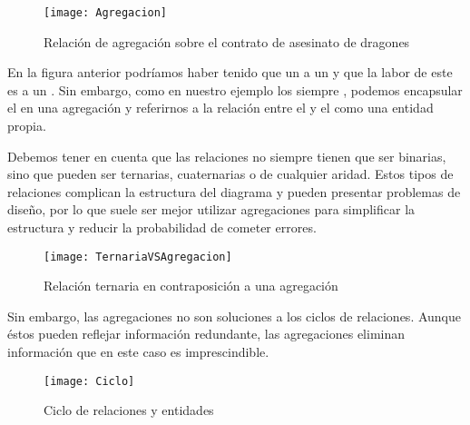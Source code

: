 \begin{figure}[h]
\begin{center}
	\texttt{[image: Agregacion]}
\end{center}
\caption{Relación de agregación sobre el contrato de asesinato de dragones}
\end{figure}

En la figura anterior podríamos haber tenido que un   a un  y que la labor de este  es  a un .
Sin embargo, como en nuestro ejemplo los  siempre  , podemos encapsular el  en una agregación y referirnos a la relación entre el  y el  como una entidad propia.

\pagebreak

Debemos tener en cuenta que las relaciones no siempre tienen que ser binarias, sino que pueden ser ternarias, cuaternarias o de cualquier aridad.
Estos tipos de relaciones complican la estructura del diagrama y pueden presentar problemas de diseño, por lo que suele ser mejor utilizar agregaciones para simplificar la estructura y reducir la probabilidad de cometer errores.

\begin{figure}[h]
\begin{center}
	\texttt{[image: TernariaVSAgregacion]}
\end{center}
\caption{Relación ternaria en contraposición a una agregación}
\end{figure}

Sin embargo, las agregaciones no son soluciones a los ciclos de relaciones.
Aunque éstos pueden reflejar información redundante, las agregaciones eliminan información que en este caso es imprescindible.

\begin{figure}[h]
\begin{center}
	\texttt{[image: Ciclo]}
\end{center}
\caption{Ciclo de relaciones y entidades}
\end{figure}
